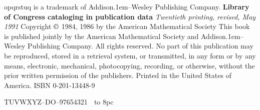 \medskip
\noindent
{\manual opqrstuq} is a trademark of Addison\kern.1em--Wesley
 Publishing Company.
\bigskip\medskip
\noindent
{\bf Library of Congress cataloging in publication data}
\medskip
{\tt{}}
\vfill
\noindent
{\sl \kern-1pt Twentieth printing, revised, May 1991} %
\smallskip
\noindent
Copyright $\copyright$ 1984, 1986 by the American Mathematical Society
\smallskip
\noindent
This book is published jointly by the American Mathematical Society
and Addison\kern.1em--Wesley Publishing Company.
All rights reserved. No part of this publication may be reproduced, stored in
a retrieval system, or transmitted, in any form or by any means,
electronic, mechanical, photocopying, recording, or otherwise, without
the prior written permission of the publishers. Printed in the United
States of America. %
\medskip
\noindent
ISBN 0-201-13448-9\par %
\noindent
TUVWXYZ--DO--97654321 %
\eject
\titlepage
\vbox to 8pc{}
\vskip2pt
\vfill
\eject
\titlepage
\null\vfill
\eject

\byebye

